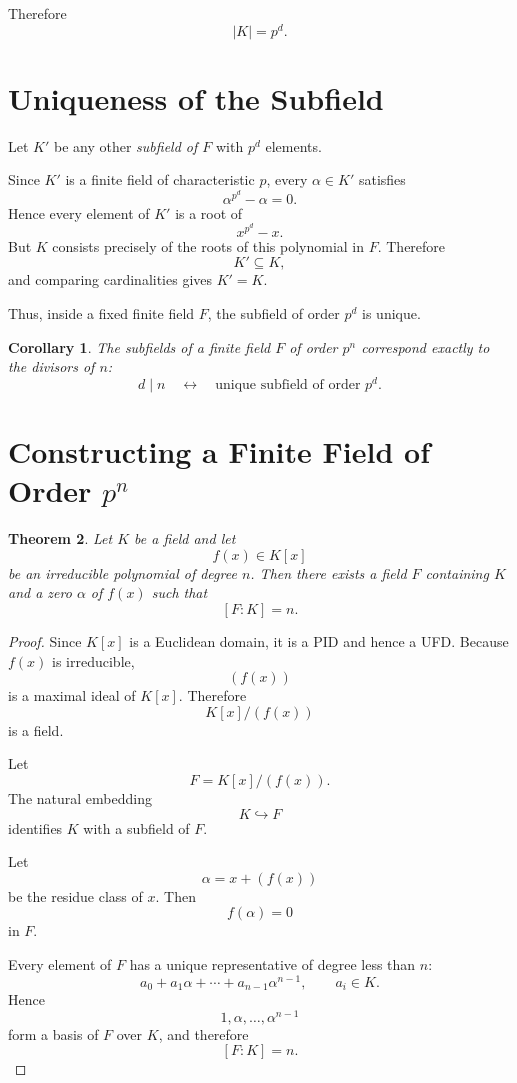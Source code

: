 \documentclass[11pt]{article}
\newtheorem{theorem}{Theorem}[section]
\newtheorem{corollary}[theorem]{Corollary}
\theoremstyle{remark}
\begin{document}
Therefore
\[
    \boxed{|K|=p^d.}
\]

\section{Uniqueness of the Subfield}

Let $K'$ be any other \emph{subfield of $F$} with $p^d$ elements.

Since $K'$ is a finite field of characteristic $p$,
every $\alpha\in K'$ satisfies
\[
    \alpha^{p^d}-\alpha=0.
\]
Hence every element of $K'$ is a root of
\[
    x^{p^d}-x.
\]
But $K$ consists precisely of the roots of this polynomial in $F$.
Therefore
\[
    K'\subseteq K,
\]
and comparing cardinalities gives $K'=K$.

Thus, inside a fixed finite field $F$, the subfield of order $p^d$ is
unique.

\begin{corollary}
The subfields of a finite field $F$ of order $p^n$ correspond exactly to
the divisors of $n$:
\[
    d\mid n
    \quad\longleftrightarrow\quad
    \text{unique subfield of order }p^d.
\]
\end{corollary}

\section{Constructing a Finite Field of Order $p^n$}

\begin{theorem}
Let $K$ be a field and let
\[
    f(x)\in K[x]
\]
be an irreducible polynomial of degree $n$. Then there exists a field
$F$ containing $K$ and a zero $\alpha$ of $f(x)$ such that
\[
    [F:K]=n.
\]
\end{theorem}

\begin{proof}
Since $K[x]$ is a Euclidean domain, it is a PID and hence a UFD.
Because $f(x)$ is irreducible,
\[
    (f(x))
\]
is a maximal ideal of $K[x]$. Therefore
\[
    \boxed{K[x]/(f(x))}
\]
is a field.

Let
\[
    F=K[x]/(f(x)).
\]
The natural embedding
\[
    K\hookrightarrow F
\]
identifies $K$ with a subfield of $F$.

Let
\[
    \alpha=x+(f(x))
\]
be the residue class of $x$. Then
\[
    f(\alpha)=0
\]
in $F$.

Every element of $F$ has a unique representative of degree less than $n$:
\[
    a_0+a_1\alpha+\cdots+a_{n-1}\alpha^{n-1},
    \qquad
    a_i\in K.
\]
Hence
\[
    1,\alpha,\ldots,\alpha^{n-1}
\]
form a basis of $F$ over $K$, and therefore
\[
    [F:K]=n.
\]
\end{proof}
\end{document}
